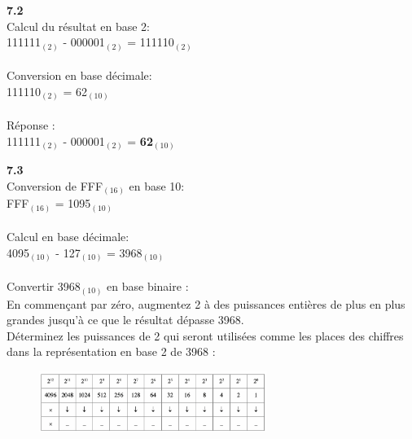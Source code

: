 \begin{Exercice}[20 minutes]
    \begin{solution} \textbf{7.2}\\
        Calcul du résultat en base 2:\\
        111111$_{(2)}$ - 000001$_{(2)}$ = 111110$_{(2)}$\\\\
        Conversion en base décimale:\\
        111110$_{(2)}$ = 62$_{(10)}$\\\\
        Réponse :\\
        111111$_{(2)}$ - 000001$_{(2)}$ = \textbf{62$_{(10)}$}\\

    \end{solution}
    
    \begin{solution} \textbf{7.3}\\
        Conversion de FFF$_{(16)}$ en base 10:\\
        FFF$_{(16)}$ = 1095$_{(10)}$\\\\
        Calcul en base décimale:\\
        4095$_{(10)}$ - 127$_{(10)}$ = 3968$_{(10)}$\\\\
        Convertir 3968$_{(10)}$ en base binaire :\\
        En commençant par zéro, augmentez 2 à des puissances entières de plus en plus grandes jusqu'à ce que le résultat dépasse 3968.\\
        Déterminez les puissances de 2 qui seront utilisées comme les places des chiffres dans la représentation en base 2 de 3968 :
        \begin{figure}[h]
            \includegraphics[width=0.66\textwidth]{img/7-3.png}
        \end{figure}


\end{solution}
\end{Exercice}
